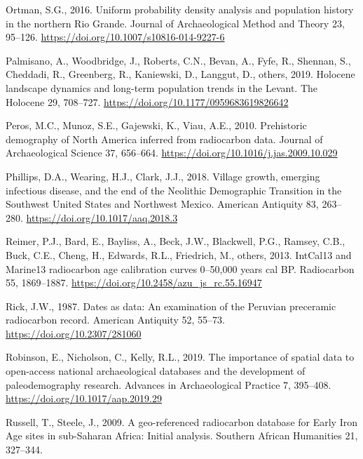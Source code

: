 \documentclass[
]{sa}
\newlength{\cslhangindent}
\newenvironment{cslreferences}%
  {\setlength{\parindent}{0pt}%
  \everypar{\setlength{\hangindent}{\cslhangindent}}\ignorespaces}%
  {\par}
\begin{document}
\begin{cslreferences}
\leavevmode\hypertarget{ref-Ortman2016}{}%
Ortman, S.G., 2016. Uniform probability density analysis and population history in the northern Rio Grande. Journal of Archaeological Method and Theory 23, 95--126. \url{https://doi.org/10.1007/s10816-014-9227-6}

\leavevmode\hypertarget{ref-Palmisano2019}{}%
Palmisano, A., Woodbridge, J., Roberts, C.N., Bevan, A., Fyfe, R., Shennan, S., Cheddadi, R., Greenberg, R., Kaniewski, D., Langgut, D., others, 2019. Holocene landscape dynamics and long-term population trends in the Levant. The Holocene 29, 708--727. \url{https://doi.org/10.1177/0959683619826642}

\leavevmode\hypertarget{ref-Peros2010}{}%
Peros, M.C., Munoz, S.E., Gajewski, K., Viau, A.E., 2010. Prehistoric demography of North America inferred from radiocarbon data. Journal of Archaeological Science 37, 656--664. \url{https://doi.org/10.1016/j.jas.2009.10.029}

\leavevmode\hypertarget{ref-Phillips2018}{}%
Phillips, D.A., Wearing, H.J., Clark, J.J., 2018. Village growth, emerging infectious disease, and the end of the Neolithic Demographic Transition in the Southwest United States and Northwest Mexico. American Antiquity 83, 263--280. \url{https://doi.org/10.1017/aaq.2018.3}

\leavevmode\hypertarget{ref-Reimer2013}{}%
Reimer, P.J., Bard, E., Bayliss, A., Beck, J.W., Blackwell, P.G., Ramsey, C.B., Buck, C.E., Cheng, H., Edwards, R.L., Friedrich, M., others, 2013. IntCal13 and Marine13 radiocarbon age calibration curves 0--50,000 years cal BP. Radiocarbon 55, 1869--1887. \url{https://doi.org/10.2458/azu_js_rc.55.16947}

\leavevmode\hypertarget{ref-Rick1987}{}%
Rick, J.W., 1987. Dates as data: An examination of the Peruvian preceramic radiocarbon record. American Antiquity 52, 55--73. \url{https://doi.org/10.2307/281060}

\leavevmode\hypertarget{ref-Robinson2019}{}%
Robinson, E., Nicholson, C., Kelly, R.L., 2019. The importance of spatial data to open-access national archaeological databases and the development of paleodemography research. Advances in Archaeological Practice 7, 395--408. \url{https://doi.org/10.1017/aap.2019.29}

\leavevmode\hypertarget{ref-Russell2009}{}%
Russell, T., Steele, J., 2009. A geo-referenced radiocarbon database for Early Iron Age sites in sub-Saharan Africa: Initial analysis. Southern African Humanities 21, 327--344.


\end{cslreferences}
\end{document}
